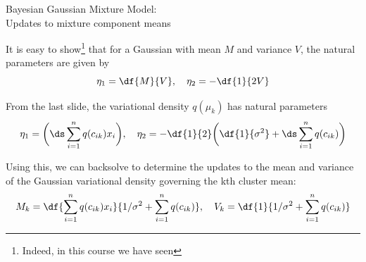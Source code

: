 \documentclass[10pt]{beamer}
\begin{document}
\begin{frame}{Bayesian Gaussian Mixture Model: \\ Updates to mixture component means}

It is easy to show\footnote{\tiny Indeed, in this course we have seen} that for a Gaussian with mean $M$ and variance $V$, the natural parameters are given by
 \[\eta_1 = \df{M}{V}, \quad \eta_2 = -\df{1}{2V} \]
 
From the last slide, the variational density $q(\mu_k)$ has natural parameters
\[ \eta_1 = \bigg( \ds\sum_{i=1}^n q(c_{ik})x_i  \bigg) , \quad \eta_2 = -\df{1}{2} \bigg(\df{1}{ \sigma^2} + \ds\sum_{i=1}^n q(c_{ik}) \bigg) \]


 
   Using this, we can backsolve to determine the updates to the mean and variance of the Gaussian variational density governing the kth cluster mean:
\[ M_k = \df{\sum_{i=1}^n q(c_{ik}) x_i}{1/\sigma^2 + \sum_{i=1}^n q(c_{ik})}, \quad V_k= \df{1}{1/\sigma^2 +\sum_{i=1}^n q(c_{ik})}\]
\end{frame}
\end{document}
